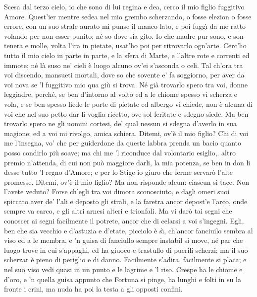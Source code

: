 \documentclass{book}
\begin{document}
	 Scesa dal terzo cielo,
	io che sono di lui regina e dea,
	cerco il mio figlio fuggitivo Amore.
	Quest'ier mentre sedea
	nel mio grembo scherzando,
	o fosse elezion o fosse errore,
	con un suo strale aurato
	mi punse il manco lato,
	e poi fugg\`{\i} da me ratto volando
	per non esser punito;
	n\'e so dove sia gito.
	Io che madre pur sono,
	e son tenera e molle,
	volta l'ira in pietate,
	usat'ho poi per ritrovarlo ogn'arte.
	Cerc'ho tutto il mio cielo in parte in parte,
	e la sfera di Marte, e l'altre rote
	e correnti ed immote;
	n\'e l\`a suso ne' cieli
	\`e luogo alcuno ov'ei s'asconda o celi.
	Tal ch'ora tra voi discendo,
	mansueti mortali,
	dove so che sovente e' fa soggiorno,
	per aver da voi nova
	se 'l fuggitivo mio qua gi\`u si trova.
	N\'e gi\`a trovarlo spero
	tra voi, donne leggiadre,
	perch\'e, se ben d'intorno
	al volto ed a le chiome
	spesso vi scherza e vola,
	e se ben spesso fiede
	le porte di pietate
	ed albergo vi chiede,
	non \`e alcuna di voi che nel suo petto
	dar li voglia ricetto,
	ove sol feritate e sdegno siede.
	Ma ben trovarlo spero
	ne gli uomini cortesi,
	de' qual nessun si sdegna
	d'averlo in sua magione;
	ed a voi mi rivolgo, amica schiera.
	Ditemi, ov'\`e il mio figlio?
	Chi di voi me l'insegna,
	vo' che per guiderdone
	da queste labbra prenda
	un bacio quanto posso
	condirlo pi\`u soave;
	ma chi me 'l riconduce
	dal volontario esiglio,.
	altro premio n'attenda,
	di cui non pu\`o maggiore
	darli, la mia potenza,
	se ben in don li desse
	tutto 'l regno d'Amore;
	e per lo Stige io giuro
	che ferme servar\`o l'alte promesse.
	Ditemi, ov'\`e il mio figlio?
	Ma non risponde alcun: ciascun si tace.
	Non l'avete veduto?
	Forse ch'egli tra voi
	dimora sconosciuto,
	e dagli omeri suoi
	spiccato aver de' l'ali
	e deposto gli strali,
	e la faretra ancor depost'e l'arco,
	onde sempre va carco,
	e gli altri arnesi alteri e trionfali.
	Ma vi dar\`o tai segni
	che conoscer ai segni
	facilmente il potrete,
	ancor che di celarsi a voi s'ingegni.
	Egli, ben che sia vecchio
	e d'astuzia e d'etate,
	picciolo \`e s\`{\i}, ch'ancor fanciuilo sembra
	al viso ed a le membra,
	e 'n guisa di fanciullo
	sempre instabil si move,
	n\'e par che luogo trove in cui s'appaghi,
	ed ha giuoco e trastullo
	di puerili scherzi;
	ma il suo scherzar \`e pieno
	di periglio e di danno.
	Facilmente s'adira,
	facilmente si placa; e nel suo viso
	vedi quasi in un punto
	e le lagrime e 'l riso.
	Crespe ha le chiome e d'oro,
	e 'n quella guisa appunto
	che Fortuna si pinge,
	ha lunghi e folti in su la fronte i crini,
	ma nuda ha poi la testa
	a gli opposti confini.
\end{document}
